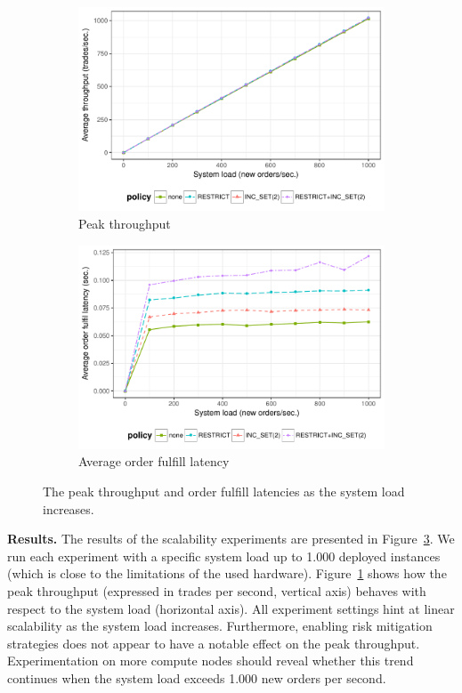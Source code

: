 \begin{figure}[t]
	\centering
	\begin{subfigure}[t]{.7\textwidth}
		\centering
		\captionsetup{width=.9\linewidth}
		\includegraphics[width=.95\linewidth]{xchange/assets/experiments/scalability}
		\caption{Peak throughput}
		\label{fig:scalability}
	\end{subfigure}
	\begin{subfigure}[t]{.7\textwidth}
		\centering
		\captionsetup{width=.9\linewidth}
		\includegraphics[width=.95\linewidth]{xchange/assets/experiments/latency}
		\caption{Average order fulfill latency}
		\label{fig:latency}
	\end{subfigure}%
	\caption{The peak throughput and order fulfill latencies as the system load increases.}
	\label{fig:scalability_latency}
\end{figure}

\textbf{Results.}
The results of the scalability experiments are presented in Figure~\ref{fig:scalability_latency}.
We run each experiment with a specific system load up to 1.000 deployed instances (which is close to the limitations of the used hardware).
Figure~\ref{fig:scalability} shows how the peak throughput (expressed in trades per second, vertical axis) behaves with respect to the system load (horizontal axis).
All experiment settings hint at linear scalability as the system load increases.
Furthermore, enabling risk mitigation strategies does not appear to have a notable effect on the peak throughput.
Experimentation on more compute nodes should reveal whether this trend continues when the system load exceeds 1.000 new orders per second.

